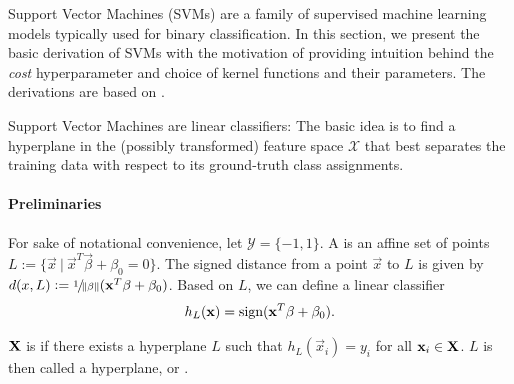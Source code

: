 \documentclass[
	fontsize=10pt, %
	twoside=false, %
	secnumdepth=1, %
  toc=indentunnumbered %
]{kaobook}
\begin{document}

Support Vector Machines (SVMs) are a family of supervised machine learning
models typically used for binary classification. In this section, we present the
basic derivation of SVMs with the motivation of providing intuition behind the
\textit{cost} hyperparameter and choice of kernel functions and their
parameters. The derivations are based on
\citeauthor{tibshirani_ElementsStatisticalLearning_2017}
\cite{tibshirani_ElementsStatisticalLearning_2017}.

Support Vector Machines are linear classifiers: 
The basic idea is to find a hyperplane in the (possibly transformed) feature
space $\mathcal{X}$ that best separates the training data with respect to its
ground-truth class assignments.


\paragraph{Preliminaries} For sake of notational convenience, let $\mathcal{Y} =
\{-1, 1\}$. A  is an affine set of points $L := \{\vec x~|~ \vec
x^T \vec \beta + \beta_0 = 0\}$. The signed distance from a point $\vec x$ to $L$ is
given by $d(x, L) := \nicefrac{1}{\norm\beta} (\mathbf{x}^T \mathbf{\beta} + \beta_0)$. Based
on $L$, we can define a linear classifier
\begin{align}
  h_L(\mathbf{x}) = \text{sign}(\mathbf{x}^T \mathbf{\beta} + \beta_0).
  \label{eq:linear-classifier}
\end{align}

$\mathbf{X}$ is  if there exists a hyperplane
$L$ such that $h_L(\vec x_i) = y_i$ for all $\mathbf{x}_i \in \mathbf{X}$. $L$ is then
called a  hyperplane, or .
\end{document}
